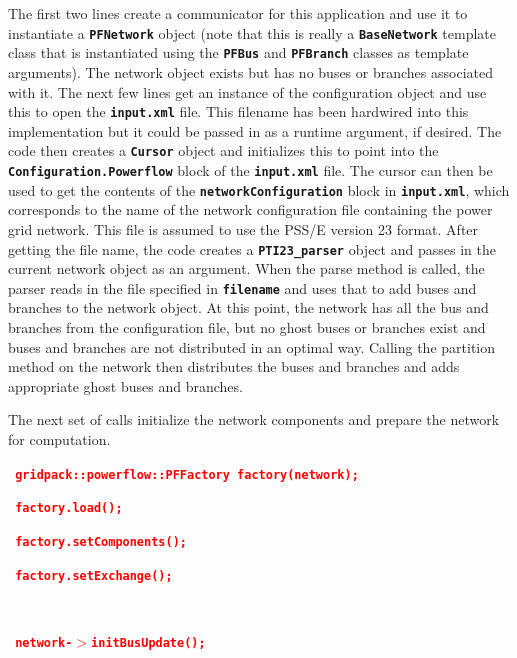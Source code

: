 \documentclass[12pt]{report} %
\begin{document}
The first two lines create a communicator for this application and use it to instantiate a \texttt{\textbf{PFNetwork}} object (note that this is really a \texttt{\textbf{BaseNetwork}} template class that is instantiated using the \texttt{\textbf{PFBus}} and \texttt{\textbf{PFBranch}} classes as template arguments). The network object exists but has no buses or branches associated with it. The next few lines get an instance of the configuration object and use this to open the \texttt{\textbf{input.xml}} file. This filename has been hardwired into this implementation but it could be passed in as a runtime argument, if desired. The code then creates a \texttt{\textbf{Cursor}} object and initializes this to point into the \texttt{\textbf{Configuration.Powerflow}} block of the \texttt{\textbf{input.xml}} file. The cursor can then be used to get the contents of the \texttt{\textbf{networkConfiguration}} block in \texttt{\textbf{input.xml}}, which corresponds to the name of the network configuration file containing the power grid network. This file is assumed to use the PSS/E version 23 format. After getting the file name, the code creates a \texttt{\textbf{PTI23\_parser}} object and passes in the current network object as an argument. When the parse method is called, the parser reads in the file specified in \texttt{\textbf{filename}} and uses that to add buses and branches to the network object. At this point, the network has all the bus and branches from the configuration file, but no ghost buses or branches exist and buses and branches are not distributed in an optimal way. Calling the partition method on the network then distributes the buses and branches and adds appropriate ghost buses and branches.

The next set of calls initialize the network components and prepare the network for computation.

\textcolor{red}{\texttt{\textbf{  gridpack::powerflow::PFFactory factory(network);}}}

\textcolor{red}{\texttt{\textbf{  factory.load();}}}

\textcolor{red}{\texttt{\textbf{}}}

\textcolor{red}{\texttt{\textbf{  factory.setComponents();}}}

\textcolor{red}{\texttt{\textbf{  factory.setExchange();}}}

\textcolor{red}{\texttt{\textbf{  }}}

\textcolor{red}{\texttt{\textbf{  network-$\boldsymbol{\mathrm{>}}$initBusUpdate();}}}
\end{document}
